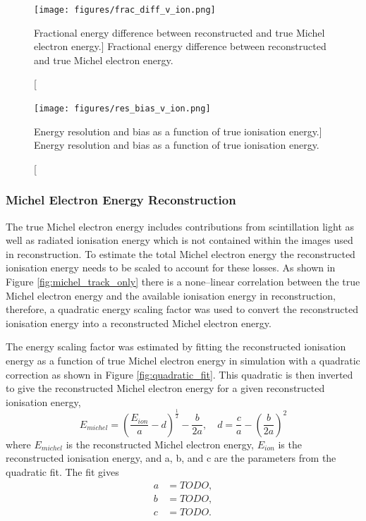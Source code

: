 
\begin{figure}
	\centering
	\texttt{[image: figures/frac\_diff\_v\_ion.png]}
	\caption
	[Fractional energy difference between reconstructed and true Michel electron
	energy.]
	{Fractional energy difference between reconstructed and true Michel electron
	energy.}
	\label{fig:frac_diff_ion}
\end{figure}

\begin{figure}
	\centering
	\texttt{[image: figures/res\_bias\_v\_ion.png]}
	\caption
	[Energy resolution and bias as a function of true ionisation energy.]
	{Energy resolution and bias as a function of true ionisation energy.}
	\label{fig:res_and_bias_ion}
\end{figure}


\subsubsection{Michel Electron Energy Reconstruction}

The true Michel electron energy includes contributions from scintillation light
as well as radiated ionisation energy which is not contained within the images
used in reconstruction. To estimate the total Michel electron energy the
reconstructed ionisation energy needs to be scaled to account for these losses.
As shown in Figure \ref{fig:michel_track_only} there is a none--linear
correlation between the true Michel electron energy and the available ionisation
energy in reconstruction, therefore, a quadratic energy scaling factor was used
to convert the reconstructed ionisation energy into a reconstructed Michel
electron energy. 

The energy scaling factor was estimated by fitting the reconstructed ionisation
energy as a function of true Michel electron energy in \protodune{} simulation
with a quadratic correction as shown in Figure \ref{fig:quadratic_fit}. This 
quadratic is then inverted to give the reconstructed Michel electron energy for 
a given reconstructed ionisation energy, 
\begin{equation}
	E_{michel} = \left( \frac{E_{ion}}{a} - d \right)^{\frac{1}{2}} - \frac{b}{2a},
	\quad d = \frac{c}{a} - \left( \frac{b}{2a} \right)^2 
\end{equation}
where $E_{michel}$ is the reconstructed Michel electron energy, $E_{ion}$ is the
reconstructed ionisation energy, and a, b, and c are the parameters from the
quadratic fit. The fit gives
\begin{align}
	a &= TODO, \\
	b &= TODO, \\
	c &= TODO.
\end{align}

